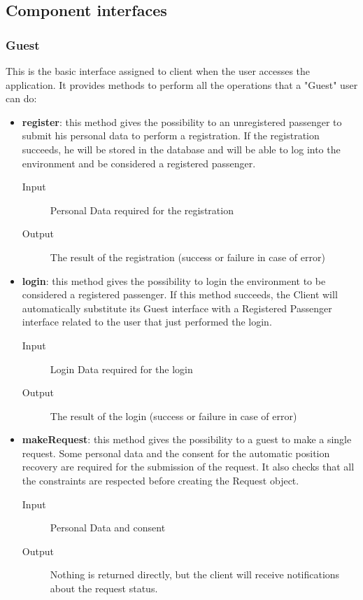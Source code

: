 	\subsection{Component interfaces}
		\subsubsection{Guest}
		This is the basic interface assigned to client when the user accesses the application.
		It provides methods to perform all the operations that a "Guest" user can do:
		\begin{itemize}
			\item \textbf{register}: this method gives the possibility to an unregistered passenger to
			submit his personal data to perform a registration. If the registration succeeds, he will be
			stored in the database and will be able to log into the environment and be considered a registered passenger.
			\begin{description}
				\item[Input] Personal Data required for the registration
				\item[Output] The result of the registration (success or failure in case of error)
			\end{description}
			\item \textbf{login}: this method gives the possibility to login the environment to be considered
			a registered passenger. If this method succeeds, the Client will automatically substitute its Guest
			interface with a Registered Passenger interface related to the user that just performed the login.
			\begin{description}
				\item[Input] Login Data required for the login
				\item[Output] The result of the login (success or failure in case of error)
			\end{description}
			\item \textbf{makeRequest}: this method gives the possibility to a guest to make a single request.
			Some personal data and the consent for the automatic position recovery are required for the submission
			of the request. It also checks that all the constraints are respected before creating the Request object.
			\begin{description}
				\item[Input] Personal Data and consent
				\item[Output] Nothing is returned directly, but the client will receive notifications about the
				request status.
			\end{description}
		\end{itemize}
